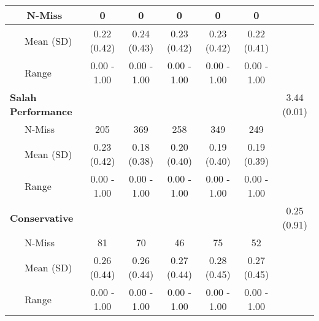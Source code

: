 \begin{tabular}{l|c|c|c|c|c|c}
\hline
~~~N-Miss & 0 & 0 & 0 & 0 & 0 & \\
\hline
~~~Mean (SD) & 0.22 (0.42) & 0.24 (0.43) & 0.23 (0.42) & 0.23 (0.42) & 0.22 (0.41) & \\
\hline
~~~Range & 0.00 - 1.00 & 0.00 - 1.00 & 0.00 - 1.00 & 0.00 - 1.00 & 0.00 - 1.00 & \\
\hline
\textbf{Salah Performance} &  &  &  &  &  & 3.44 (0.01)\\
\hline
~~~N-Miss & 205 & 369 & 258 & 349 & 249 & \\
\hline
~~~Mean (SD) & 0.23 (0.42) & 0.18 (0.38) & 0.20 (0.40) & 0.19 (0.40) & 0.19 (0.39) & \\
\hline
~~~Range & 0.00 - 1.00 & 0.00 - 1.00 & 0.00 - 1.00 & 0.00 - 1.00 & 0.00 - 1.00 & \\
\hline
\textbf{Conservative} &  &  &  &  &  & 0.25 (0.91)\\
\hline
~~~N-Miss & 81 & 70 & 46 & 75 & 52 & \\
\hline
~~~Mean (SD) & 0.26 (0.44) & 0.26 (0.44) & 0.27 (0.44) & 0.28 (0.45) & 0.27 (0.45) & \\
\hline
~~~Range & 0.00 - 1.00 & 0.00 - 1.00 & 0.00 - 1.00 & 0.00 - 1.00 & 0.00 - 1.00 & \\
\hline
\end{tabular}

